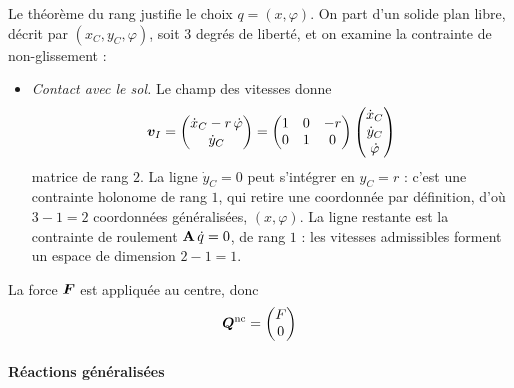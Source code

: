 \begin{remarque}
    Le théorème du rang justifie le choix $q = (x,\varphi)$. On part
    d'un solide plan libre, décrit par $(x_C,y_C,\varphi)$, soit
    $3$ degrés de liberté, et on examine la contrainte de non-glissement :
    \begin{itemize}
        \item \emph{Contact avec le sol.} Le champ des vitesses donne
            \[
                \bm{v}_I
                = \begin{pmatrix}
                    \dot x_C - r\,\dot\varphi\\ \dot y_C
                \end{pmatrix}
                = \begin{pmatrix}
                    1 & 0 & -r\\ 0 & 1 & 0
                \end{pmatrix}
                \begin{pmatrix}
                    \dot x_C\\ \dot y_C\\ \dot\varphi
                \end{pmatrix}
            \]
            matrice de rang $2$. La ligne $\dot y_C = 0$ peut s'intégrer en
            $y_C = r$ : c'est une contrainte holonome de rang $1$, qui
            retire une coordonnée par définition, d'où $3 - 1 = 2$ coordonnées
            généralisées, $(x,\varphi)$. La ligne restante est la
            contrainte de roulement $\mathbf{A}\,\dot q = 0$, de rang $1$
            : les vitesses admissibles forment un espace de dimension
            $2 - 1 = 1$.
    \end{itemize}
\end{remarque}

La force $\bm{F}$ est appliquée au centre, donc
\[
    \bm{Q}^{\mathrm{nc}} = \begin{pmatrix} F\\ 0 \end{pmatrix}
\]

\paragraph{Réactions généralisées}

